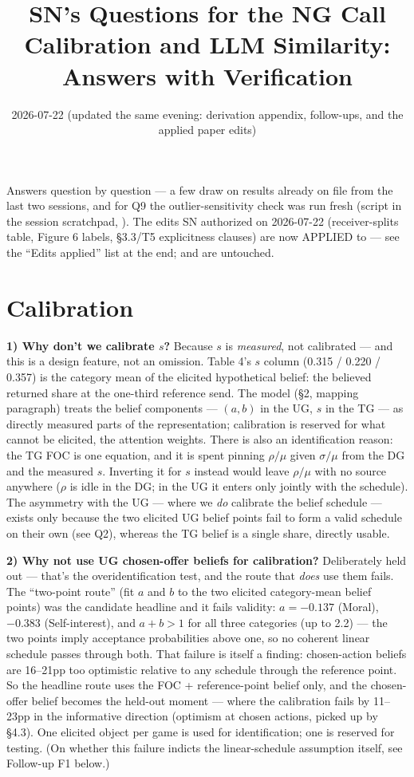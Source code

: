 \documentclass[11pt]{article}
\title{\textbf{SN's Questions for the NG Call\\[2pt] \large Calibration and LLM Similarity: Answers with Verification}}
\date{2026-07-22 (updated the same evening: derivation appendix, follow-ups, and the applied paper edits)}
\newcommand{\code}[1]{\path{#1}}
\begin{document}
\maketitle

Answers question by question --- a few draw on results already on file from the last two sessions, and for Q9 the outlier-sensitivity check was run fresh (script in the session scratchpad, \code{f6_outlier_check.py}). The edits SN authorized on 2026-07-22 (receiver-splits table, Figure 6 labels, \S3.3/T5 explicitness clauses) are now APPLIED to \code{main.tex} --- see the ``Edits applied'' list at the end; \code{main_v1.tex} and \code{main_v2.tex} are untouched.

\section*{Calibration}

\textbf{1) Why don't we calibrate $s$?} Because $s$ is \emph{measured}, not calibrated --- and this is a design feature, not an omission. Table 4's $s$ column (0.315 / 0.220 / 0.357) is the category mean of the elicited hypothetical belief: the believed returned share at the one-third reference send. The model (\S2, mapping paragraph) treats the belief components --- $(a,b)$ in the UG, $s$ in the TG --- as directly measured parts of the representation; calibration is reserved for what cannot be elicited, the attention weights. There is also an identification reason: the TG FOC is one equation, and it is spent pinning $\rho/\mu$ given $\sigma/\mu$ from the DG and the measured $s$. Inverting it for $s$ instead would leave $\rho/\mu$ with no source anywhere ($\rho$ is idle in the DG; in the UG it enters only jointly with the schedule). The asymmetry with the UG --- where we \emph{do} calibrate the belief schedule --- exists only because the two elicited UG belief points fail to form a valid schedule on their own (see Q2), whereas the TG belief is a single share, directly usable.

\textbf{2) Why not use UG chosen-offer beliefs for calibration?} Deliberately held out --- that's the overidentification test, and the route that \emph{does} use them fails. The ``two-point route'' (fit $a$ and $b$ to the two elicited category-mean belief points) was the candidate headline and it fails validity: $a = -0.137$ (Moral), $-0.383$ (Self-interest), and $a+b > 1$ for all three categories (up to 2.2) --- the two points imply acceptance probabilities above one, so no coherent linear schedule passes through both. That failure is itself a finding: chosen-action beliefs are 16--21pp too optimistic relative to any schedule through the reference point. So the headline route uses the FOC + reference-point belief only, and the chosen-offer belief becomes the held-out moment --- where the calibration fails by 11--23pp in the informative direction (optimism at chosen actions, picked up by \S4.3). One elicited object per game is used for identification; one is reserved for testing. (On whether this failure indicts the linear-schedule assumption itself, see Follow-up F1 below.)
\end{document}
